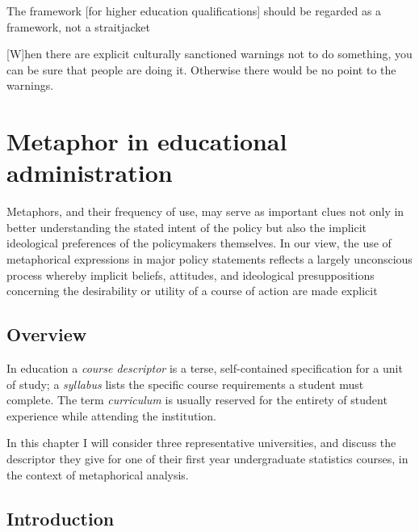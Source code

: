 \begin{singlespace}
\begin{savequote}[105mm]
The framework [for higher education qualifications] should be regarded
as a framework, not a straitjacket

[W]hen there are explicit culturally sanctioned warnings not to do
something, you can be sure that people are doing it.  Otherwise there
would be no point to the warnings.
\end{savequote}
\end{singlespace}

\chapter{Metaphor in educational administration}
\label{chapter3}

\begin{singlespace}
\setlength{\epigraphwidth}{.7\textwidth} %
\epigraph{Metaphors, and their frequency of use, may serve as
  important clues not only in better understanding the stated intent
  of the policy but also the implicit ideological preferences of the
  policymakers themselves.  In our view, the use of metaphorical
  expressions in major policy statements reflects a largely
  unconscious process whereby implicit beliefs, attitudes, and
  ideological presuppositions concerning the desirability or utility
  of a course of action are made explicit}{}
\end{singlespace}

\section{Overview}

In education a \emph{course descriptor} is a terse, self-contained
specification for a unit of study; a \emph{syllabus} lists the
specific course requirements a student must complete.  The term
\emph{curriculum} is usually reserved for the entirety of student
experience while attending the institution.

In this chapter I will consider three representative universities, and
discuss the descriptor they give for one of their first year
undergraduate statistics courses, in the context of metaphorical
analysis.

\section{Introduction}

